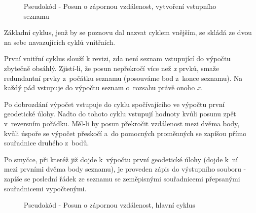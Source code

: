     \begin{figure}[h]
    \centering
    \begin{algorithmic}[1]
    \ENDWHILE
    \end{algorithmic}
    \caption{Pseudokód - Posun o zápornou vzdálenost, vytvoření vstupního seznamu}
    \label{fig:pseudozapornavzd-vstup}
    \end{figure}

Základní cyklus, jenž by se poznovu dal nazvat cyklem vnějším, se skládá ze dvou na sebe
navazujících cyklů vnitřních. 

První vnitřní cyklus slouží k revizi, zda není seznam vstupující do výpočtu zbytečně obsáhlý.
Zjistí-li, že posun nepřekročí více než \textit{x} prvků, smaže redundantní prvky z~počátku seznamu (posouváme bod
z~konce seznamu). Na každý pád vstupuje do výpočtu seznam o~rozsahu právě onoho \textit{x}. 

Po dobrozdání výpočet vstupuje do cyklu spočívajícího ve výpočtu první geode\-tické úlohy.
Nadto do tohoto cyklu vstupují hodnoty kvůli posunu zpět v~reversním pořádku. Měl-li by
posun překročit vzdálenost mezi dvěma body, kvůli úspoře se výpočet přeskočí a~do pomocných
proměnných se zapíšou přímo souřadnice druhého z~bodů. 

Po smyčce, při kteréž již dojde k~výpočtu první geodetické úlohy
(dojde k~ní mezi prvními dvěma body seznamu), je proveden zápis do výstupního
souboru - zapíše se poslední řádek ze seznamu se zeměpisnými souřadnicemi přepsanými
souřadnicemi vypočtenými. 

    \begin{figure}[h]
    \centering
    \begin{algorithmic}[1]
    \ENDIF
    \ENDFOR
    \ENDWHILE
    \end{algorithmic}
    \caption{Pseudokód - Posun o zápornou vzdálenost, hlavní cyklus}
    \label{fig:pseudozapornavzd-hlavnicyklus}
    \end{figure}

